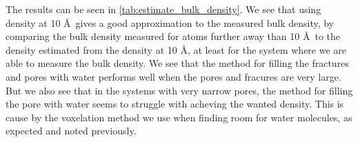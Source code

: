 The results can be seen in \cref{tab:estimate_bulk_density}. We see that using density at 10 \AA\ gives a good approximation to the measured bulk density, by comparing the bulk density measured for atoms further away than 10 \AA\ to the density estimated from the density at 10 \AA, at least for the system where we are able to measure the bulk density. We see that the method for filling the fractures and pores with water performs well when the pores and fracures are very large. But we also see that in the systems with very narrow pores, the method for filling the pore with water seems to struggle with acheving the wanted density. This is cause by the voxelation method we use when finding room for water molecules, as expected and noted previously.
